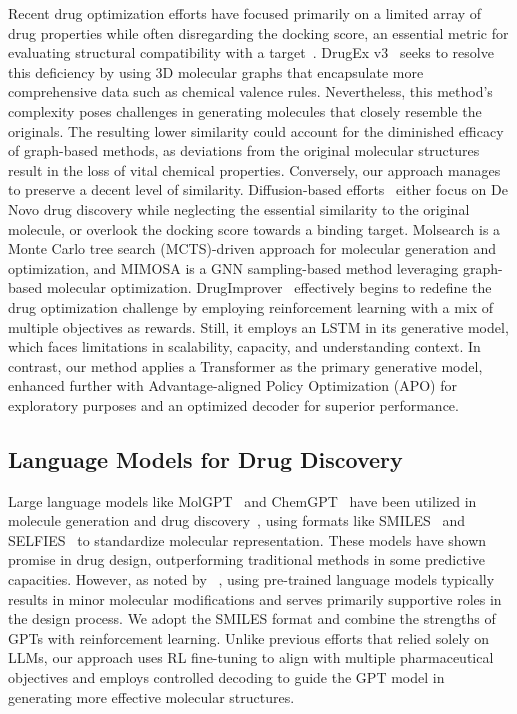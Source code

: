 Recent drug optimization efforts have focused primarily on a limited array of drug properties while often disregarding the docking score, an essential metric for evaluating structural compatibility with a target~\citep{zhou2019optimization, erikawa2021mermaid}. DrugEx v3~\citep{liu2023drugex} seeks to resolve this deficiency by using 3D molecular graphs that encapsulate more comprehensive data such as chemical valence rules. Nevertheless, this method's complexity poses challenges in generating molecules that closely resemble the originals. The resulting lower similarity could account for the diminished efficacy of graph-based methods, as deviations from the original molecular structures result in the loss of vital chemical properties. Conversely, our approach manages to preserve a decent level of similarity. 
Diffusion-based efforts~\citep{alakhdar2024diffusion,morehead2024geometry} either focus on De Novo drug discovery while neglecting the essential similarity to the original molecule, or overlook the docking score towards a binding target.
Molsearch \citep{sun2022molsearch} is a Monte Carlo tree search (MCTS)-driven approach for molecular generation and optimization, 
and MIMOSA \citep{fu2021mimosa} is a GNN sampling-based method leveraging graph-based molecular optimization.
DrugImprover~\citep{liu2023drugimprover} effectively begins to redefine the drug optimization challenge by employing reinforcement learning with a mix of multiple objectives as rewards. Still, it employs an LSTM in its generative model, which faces limitations in scalability, capacity, and understanding context. In contrast, our method applies a Transformer as the primary generative model, enhanced further with Advantage-aligned Policy Optimization (APO) for exploratory purposes and an optimized decoder for superior performance.








\subsection{Language Models for Drug Discovery}




Large language models like MolGPT~\citep{bagal2021molgpt} and ChemGPT~\citep{frey2023neural} have been utilized in molecule generation and drug discovery~\citep{bagal2021molgpt,rothchild2021c5t5,wang2022transformer}, using formats like SMILES~\citep{weininger1988smiles} and SELFIES~\citep{krenn2020self} to standardize molecular representation. These models have shown promise in drug design, outperforming traditional methods in some predictive capacities. However, as noted by ~\citet{murakumo2023llm}, using pre-trained language models typically results in minor molecular modifications and serves primarily supportive roles in the design process. We adopt the SMILES format and combine the strengths of GPTs with reinforcement learning. Unlike previous efforts that relied solely on LLMs, our approach uses RL fine-tuning to align with multiple pharmaceutical objectives and employs controlled decoding to guide the GPT model in generating more effective molecular structures.

